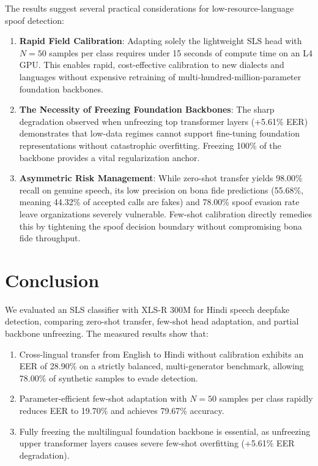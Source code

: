 \documentclass[conference]{IEEEtran}
\begin{document}
The results suggest several practical considerations for low-resource-language spoof detection:

\begin{enumerate}
    \item \textbf{Rapid Field Calibration}: Adapting solely the lightweight SLS head with $N=50$ samples per class requires under 15 seconds of compute time on an L4 GPU. This enables rapid, cost-effective calibration to new dialects and languages without expensive retraining of multi-hundred-million-parameter foundation backbones.

    \item \textbf{The Necessity of Freezing Foundation Backbones}: The sharp degradation observed when unfreezing top transformer layers (+5.61\% EER) demonstrates that low-data regimes cannot support fine-tuning foundation representations without catastrophic overfitting. Freezing 100\% of the backbone provides a vital regularization anchor.

    \item \textbf{Asymmetric Risk Management}: While zero-shot transfer yields 98.00\% recall on genuine speech, its low precision on bona fide predictions (55.68\%, meaning 44.32\% of accepted calls are fakes) and 78.00\% spoof evasion rate leave organizations severely vulnerable. Few-shot calibration directly remedies this by tightening the spoof decision boundary without compromising bona fide throughput.
\end{enumerate}

\section{Conclusion}

We evaluated an SLS classifier with XLS-R 300M for Hindi speech deepfake detection, comparing zero-shot transfer, few-shot head adaptation, and partial backbone unfreezing. The measured results show that:

\begin{enumerate}
    \item Cross-lingual transfer from English to Hindi without calibration exhibits an EER of 28.90\% on a strictly balanced, multi-generator benchmark, allowing 78.00\% of synthetic samples to evade detection.
    \item Parameter-efficient few-shot adaptation with $N=50$ samples per class rapidly reduces EER to 19.70\% and achieves 79.67\% accuracy.
    \item Fully freezing the multilingual foundation backbone is essential, as unfreezing upper transformer layers causes severe few-shot overfitting (+5.61\% EER degradation).
\end{enumerate}
\end{document}
